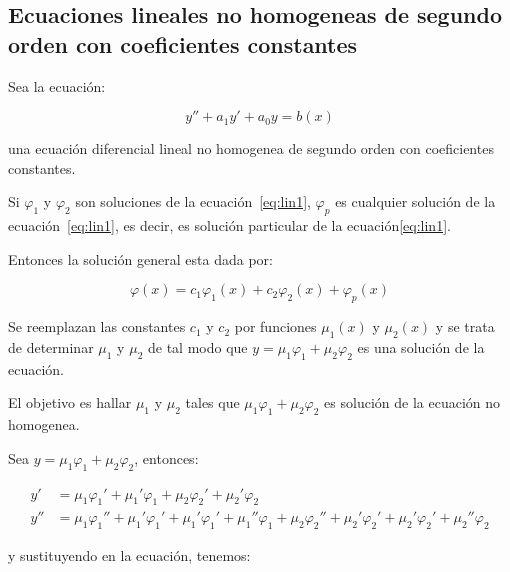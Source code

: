 	\newpage
	\subsection{Ecuaciones lineales no homogeneas de segundo orden con coeficientes constantes}

		\begin{definicion}
			Sea la ecuación:

			\begin{equation} \label{eq:lin1}
				y'' + a_1 y' + a_0 y = b(x)
			\end{equation}

			una ecuación diferencial lineal no homogenea de segundo orden con coeficientes constantes.
		\end{definicion}

		\begin{teorema}
			Si $\varphi_1$ y $\varphi_2$ son soluciones de la ecuación~\ref{eq:lin1}, $\varphi_p$ es cualquier solución de la ecuación~\ref{eq:lin1}, es decir, es solución particular de la ecuación\ref{eq:lin1}.

			Entonces la solución general esta dada por:

			\begin{equation}
				\varphi(x) = c_1 \varphi_1(x) + c_2 \varphi_2(x) + \varphi_p(x)
			\end{equation}
		\end{teorema}

		Se reemplazan las constantes $c_1$ y $c_2$ por funciones $\mu_1(x)$ y $\mu_2(x)$ y se trata de determinar $\mu_1$ y $\mu_2$ de tal modo que $y = \mu_1 \varphi_1 + \mu_2 \varphi_2$ es una solución de la ecuación.

		El objetivo es hallar $\mu_1$ y $\mu_2$ tales que $\mu_1 \varphi_1 + \mu_2 \varphi_2$ es solución de la ecuación no homogenea.

		Sea $y = \mu_1 \varphi_1 + \mu_2 \varphi_2$, entonces:

		\begin{align*}
			y' &= \mu_1 \varphi_1' + \mu_1' \varphi_1 + \mu_2 \varphi_2' + \mu_2' \varphi_2 \\
			y'' &= \mu_1 \varphi_1'' + \mu_1' \varphi_1' + \mu_1' \varphi_1' + \mu_1'' \varphi_1 + \mu_2 \varphi_2'' + \mu_2' \varphi_2' + \mu_2' \varphi_2' + \mu_2'' \varphi_2
		\end{align*}

		y sustituyendo en la ecuación, tenemos:

